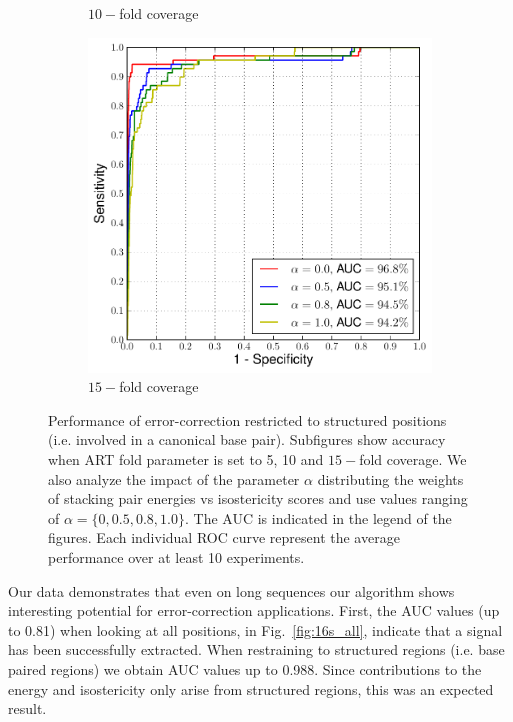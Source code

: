 \begin{figure}
\begin{subfigure}{.33\textwidth}
    \caption{$10-$fold coverage}
\end{subfigure}
\begin{subfigure}{.33\textwidth}
  \centering
  \includegraphics[width=\linewidth]{Figure11-15fold-b}
    \caption{$15-$fold coverage}
\end{subfigure}
\caption{Performance of error-correction restricted to structured positions (i.e. involved in a canonical base pair). Subfigures show accuracy when
ART fold parameter is set to 5, 10 and $15-$fold coverage. We also analyze the impact of the parameter $\alpha$ distributing the weights of stacking pair energies vs isostericity scores and use values ranging of $\alpha = \{0, 0.5, 0.8, 1.0\}$. The AUC is indicated in the legend of the figures. Each individual ROC curve represent the average performance over at least 10 experiments.}
\label{fig:16s_bp}
\end{figure}

Our data demonstrates that even on long sequences our algorithm shows interesting potential for 
error-correction applications. First, the AUC values (up to 0.81) when looking at all positions, 
in Fig.~\ref{fig:16s_all},  indicate that a signal has been successfully extracted. When restraining
to structured regions (i.e. base paired regions) we obtain AUC values up to 0.988.  Since 
contributions to the energy and isostericity only arise from structured regions, this was an expected result.

